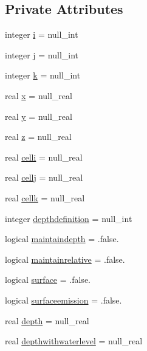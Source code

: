 \subsection*{Private Attributes}
\begin{DoxyCompactItemize}
\item 
integer \mbox{\hyperlink{structmodulelagrangian_1_1t__position_ac7e8916a663f763296839462650c48be}{i}} = null\+\_\+int
\item 
integer \mbox{\hyperlink{structmodulelagrangian_1_1t__position_aa960f5135a72e6639e7f52a1bbce9e46}{j}} = null\+\_\+int
\item 
integer \mbox{\hyperlink{structmodulelagrangian_1_1t__position_a7014fdf259654a2e7d2755a5edf24f14}{k}} = null\+\_\+int
\item 
real \mbox{\hyperlink{structmodulelagrangian_1_1t__position_af6972d3f97d263adb7727a4775ae38f7}{x}} = null\+\_\+real
\item 
real \mbox{\hyperlink{structmodulelagrangian_1_1t__position_a25e250ef0fefdc552cce5d3dfb392a65}{y}} = null\+\_\+real
\item 
real \mbox{\hyperlink{structmodulelagrangian_1_1t__position_a89877ec4dbe96ee94fc21e6018314c6d}{z}} = null\+\_\+real
\item 
real \mbox{\hyperlink{structmodulelagrangian_1_1t__position_af5cf1fb4396e03b800e2f9e766a4af00}{celli}} = null\+\_\+real
\item 
real \mbox{\hyperlink{structmodulelagrangian_1_1t__position_af05e474d746d05fc1d50acb1b37dd6cb}{cellj}} = null\+\_\+real
\item 
real \mbox{\hyperlink{structmodulelagrangian_1_1t__position_ab8fedd7036002b32837cadb782dc50be}{cellk}} = null\+\_\+real
\item 
integer \mbox{\hyperlink{structmodulelagrangian_1_1t__position_ad1352f909aa82fdd9f11a4d828ecf251}{depthdefinition}} = null\+\_\+int
\item 
logical \mbox{\hyperlink{structmodulelagrangian_1_1t__position_a400d1aa02ffd4198aca42dc08b923d6d}{maintaindepth}} = .false.
\item 
logical \mbox{\hyperlink{structmodulelagrangian_1_1t__position_a7a8b5ab381b020c0c9f68cabff20b27b}{maintainrelative}} = .false.
\item 
logical \mbox{\hyperlink{structmodulelagrangian_1_1t__position_a1c03b172fdacfd2d4203bad5c1139f10}{surface}} = .false.
\item 
logical \mbox{\hyperlink{structmodulelagrangian_1_1t__position_ad7f63703fbaaf283f99693902c9f352f}{surfaceemission}} = .false.
\item 
real \mbox{\hyperlink{structmodulelagrangian_1_1t__position_aa6da9774639afe9c9d8f7f7b89c1e4e4}{depth}} = null\+\_\+real
\item 
real \mbox{\hyperlink{structmodulelagrangian_1_1t__position_ac8945119070e78b05c8e853ed0ce3e0e}{depthwithwaterlevel}} = null\+\_\+real
\end{DoxyCompactItemize}


